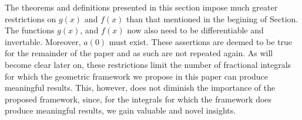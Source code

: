 \documentclass[twoside,reqno,11pt]{fcaa-var} %
\begin{document}
The theorems and definitions presented in this section impose much greater restrictions on $g(x)$ and $f(x)$ than that mentioned in the begining of Section. The functions 
$g(x)$, and $f(x)$ now also need to be differentiable and invertable. Moreover, $a(0)$ must exist. These assertions are deemed to be true for the remainder of the paper and as such are not repeated again. As will become clear later on, these restrictions limit the number of fractional integrals for which the geometric framework we propose in this paper can produce meaningful results. This, however, does not diminish the importance of the proposed framework, since, for the integrals for which the framework does produce meaningful results, we gain valuable and novel insights.

% 
% 
% 
\end{document}
